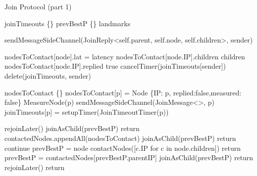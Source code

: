 
\begin{algorithm}
\caption{Join Protocol (part 1)}
\begin{algorithmic}[1]

    \State joinTimeouts \asdassign \{\}
    \State prevBestP \asdassign \{\}
    \State landmarks \asdassign [landmarks]
\asdend
    
    \asdend

    \State sendMessageSideChannel(JoinReply<self.parent, self.node, self.children>, sender)
\asdend
    
        \State nodesToContact[node].lat = latency
        \State nodesToContact[node.IP].children \asdassign children
        \State nodesToContact[node.IP].replied \asdassign true
        \State cancelTimer(joinTimeouts[sender])
        \State delete(joinTimeouts, sender)
\asdend
   
    \State nodesToContact \asdassign \{\}
        \State nodesToContact[p] = Node \{IP: p, replied:false,measured: false\}
        \State MeasureNode(p) 
        \State sendMessageSideChannel(JoinMessage<>, p)
        \State joinTimeouts[p] = \asdassign setupTimer(JoinTimeoutTimer(p))
    \EndFor
\asdend

            {rejoinLater()}
            {joinAsChild(prevBestP) }
            \State return
        \EndIf
        \State contactedNodes.appendAll(nodesToContact)
                \State joinAsChild(prevBestP)
                \State return
            \EndIf
                \State continue 
            \EndIf
            \State prevBestP = node
            \State contactNodes([c.IP for c in node.children])
            \State return
                \State prevBestP = contactedNodes[prevBestP.parentIP]
                \State joinAsChild(prevBestP)       
                \State return
            \Else
                \State rejoinLater()
                \State return
            \EndIf
        \EndFor
    \asdend
   

\end{algorithmic}
\end{algorithm}
